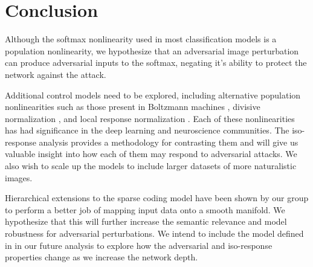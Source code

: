 




\section{Conclusion}
Although the softmax nonlinearity used in most classification models is a population nonlinearity, we hypothesize that an adversarial image perturbation can produce adversarial inputs to the softmax, negating it's ability to protect the network against the attack.

Additional control models need to be explored, including alternative population nonlinearities such as those present in Boltzmann machines \parencite{salakhutdinov2009deep}, divisive normalization \parencite{balle2016end}, and local response normalization \parencite{krizhevsky2012imagenet}. Each of these nonlinearities has had significance in the deep learning and neuroscience communities. The iso-response analysis provides a methodology for contrasting them and will give us valuable insight into how each of them may respond to adversarial attacks. We also wish to scale up the models to include larger datasets of more naturalistic images. 

Hierarchical extensions to the sparse coding model \parencite{chen2018sparse} have been shown by our group to perform a better job of mapping input data onto a smooth manifold. We hypothesize that this will further increase the semantic relevance and model robustness for adversarial perturbations. We intend to include the model defined in \parencite{chen2018sparse} in our future analysis to explore how the adversarial and iso-response properties change as we increase the network depth.

